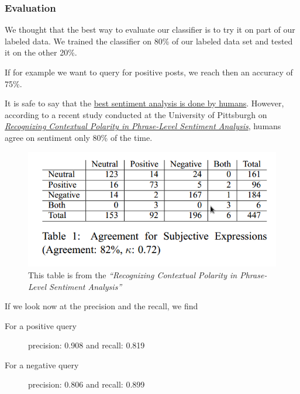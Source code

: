 \subsubsection*{Evaluation}
We thought that the best way to evaluate our classifier is to try it on part of our labeled data.
We trained the classifier on 80\% of our labeled data set and tested it on the other 20\%.

If for example we want to query for positive posts, we reach then an accuracy of 75\%. 

It is safe to say that the \href{http://www.webmetricsguru.com/archives/2010/04/sentiment-analysis-best-done-by-humans/}{best sentiment analysis is done by humans}. However, according to a recent 
study conducted at the University of Pittsburgh on \textit{\href{http://people.cs.pitt.edu/~wiebe/pubs/papers/emnlp05polarity.pdf}{Recognizing Contextual Polarity in Phrase-Level Sentiment Analysis}}, 
humans agree on sentiment only 80\% of the time.


\begin{figure}[h]
\centering
\includegraphics[scale=.5]{images/sent1.png}
\caption{This table is from the \textit{``Recognizing Contextual Polarity in Phrase-Level Sentiment Analysis''}}
\end{figure}

If we look now at the precision and the recall, we find

\begin{description}
 \item[For a positive query] 
 
  precision: 0.908 and 
  recall: 0.819
 

 \item[For a negative query]
 
  precision: 0.806 and
  recall: 0.899
 
\end{description}

